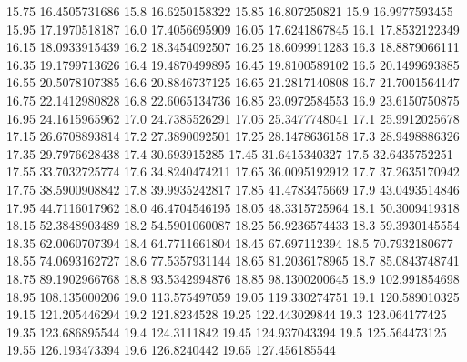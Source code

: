           15.75    16.4505731686
           15.8    16.6250158322
          15.85     16.807250821
           15.9    16.9977593455
          15.95    17.1970518187
           16.0    17.4056695909
          16.05    17.6241867845
           16.1    17.8532122349
          16.15    18.0933915439
           16.2    18.3454092507
          16.25    18.6099911283
           16.3    18.8879066111
          16.35    19.1799713626
           16.4    19.4870499895
          16.45    19.8100589102
           16.5    20.1499693885
          16.55    20.5078107385
           16.6    20.8846737125
          16.65    21.2817140808
           16.7    21.7001564147
          16.75    22.1412980828
           16.8    22.6065134736
          16.85    23.0972584553
           16.9    23.6150750875
          16.95    24.1615965962
           17.0    24.7385526291
          17.05    25.3477748041
           17.1    25.9912025678
          17.15    26.6708893814
           17.2    27.3890092501
          17.25    28.1478636158
           17.3    28.9498886326
          17.35    29.7976628438
           17.4     30.693915285
          17.45    31.6415340327
           17.5    32.6435752251
          17.55    33.7032725774
           17.6    34.8240474211
          17.65    36.0095192912
           17.7    37.2635170942
          17.75    38.5900908842
           17.8    39.9935242817
          17.85    41.4783475669
           17.9    43.0493514846
          17.95    44.7116017962
           18.0    46.4704546195
          18.05    48.3315725964
           18.1    50.3009419318
          18.15    52.3848903489
           18.2    54.5901060087
          18.25    56.9236574433
           18.3    59.3930145554
          18.35    62.0060707394
           18.4    64.7711661804
          18.45     67.697112394
           18.5    70.7932180677
          18.55    74.0693162727
           18.6    77.5357931144
          18.65    81.2036178965
           18.7    85.0843748741
          18.75    89.1902966768
           18.8    93.5342994876
          18.85    98.1300200645
           18.9    102.991854698
          18.95    108.135000206
           19.0    113.575497059
          19.05    119.330274751
           19.1    120.589010325
          19.15    121.205446294
           19.2      121.8234528
          19.25    122.443029844
           19.3    123.064177425
          19.35    123.686895544
           19.4      124.3111842
          19.45    124.937043394
           19.5    125.564473125
          19.55    126.193473394
           19.6      126.8240442
          19.65    127.456185544
